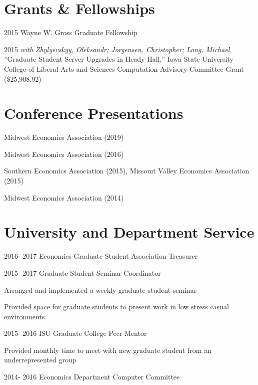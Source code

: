 \documentclass[letterpaper]{article}
\renewenvironment{itemize}{
  \begin{list}{}{
    \setlength{\leftmargin}{0em}
  }
}{
  \end{list}
}
\begin{document}
\section*{Grants \& Fellowships}


\begin{itemize}
\item 2015 Wayne W. Gross Graduate Fellowship
\item 2015 \textit{with Zhylyevskyy, Oleksandr; Jorgensen, Christopher; Long, Michael}, ''Graduate Student Server Upgrades in Heady Hall,'' Iowa State University College of Liberal Arts and Sciences Computation Advisory Committee Grant (\$25,908.92)
\end{itemize}
\section*{Conference Presentations}


\begin{itemize}
\item Midwest Economics Association (2019)
\item Midwest Economics Association (2016)
\item Southern Economics Association (2015), Missouri Valley Economics Association (2015)
\item Midwest Economics Association (2014)
\end{itemize}

\section*{University and Department Service}

\begin{itemize}
\item 2016- 2017 Economics Graduate Student Association Treasurer
\item 2015- 2017 Graduate Student Seminar Coordinator
\begin{itemize}
\item Arranged and implemented a weekly graduate student seminar
\item Provided space for graduate students to present work in low stress casual environments
  \end{itemize}
\item 2015- 2016 ISU Graduate College Peer Mentor
\begin{itemize}
\item Provided monthly time to meet with new graduate student from an underrepresented group
\end{itemize}
\item 2014- 2016 Economics Department Computer Committee
\end{itemize}
\end{document}
